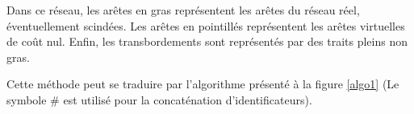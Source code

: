 Dans ce réseau, les arêtes en gras représentent les arêtes du réseau réel,
éven\-tu\-el\-le\-ment scindées. Les arêtes en pointillés représentent les
arêtes virtuelles de coût nul. Enfin, les transbordements sont représentés par
des traits pleins non gras.

Cette méthode peut se traduire par l'algorithme présenté à la figure \ref{algo1}
(Le symbole \# est utilisé pour la concaténation d'identificateurs).


\begin{center}
\begin{figure}[htbp]
\center
{}
\end{figure}
\end{center}

